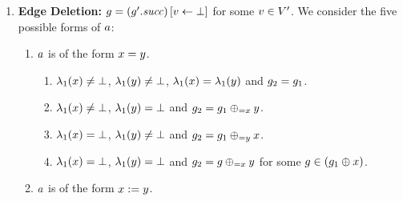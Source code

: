 {\begin{enumerate}
\begin{enumerate}
\begin{enumerate}
    $\labeling_1(\yvar)\neq\undef$, %
    $\labeling_1(\xvar)\neq\labeling_1(\nil)$ %
    and %
    $\graph_2=\graph_1$.
  \item \label{pre:case:dotNextAssignedD}%
    $\labeling_1(\xvar)\neq\undef$, %
    $\suc(\labeling_1(\xvar))=\undef$, %
    $\labeling_1(\yvar)=\undef$, %
    $\labeling_1(\xvar)\neq\labeling_1(\nil)$ and %
    $\graph_2\in\graph_1\addVar{\yvar}$.
  \item \label{pre:case:dotNextAssignedE}%
    $\labeling_1(\xvar)=\undef$,%
    $\labeling_1(\yvar)\neq\undef$ and %
    $\graph_2=\graph\delEdge{\xvar}$, where %
    $\graph\in\graph_1\addVarAsPredOf{\yvar}{\xvar}$.
  \item \label{pre:case:dotNextAssignedF}%
    $\labeling_1(\xvar)=\undef$, %
    $\labeling_1(\yvar)=\undef$ and %
    there are graphs $\graph,\graph'$ such that
    $\graph\in\graph_1\addVar{\yvar}$, %
    $\graph'\in\graph\addVarAsPredOf{\yvar}{\xvar}$ and %
    $\graph_2=\graph'\delEdge{\xvar}$.
  \end{enumerate}
%
\end{enumerate}
\item {\bf Edge Deletion:}
$g=\left(g'.{\it succ}\right)\left[v\leftarrow\bot\right]$ 
for some
$v\in V'$.
%
We consider
the five possible forms of $a$:
%
%
\begin{enumerate}
\item $a$ is of the form $x=y$.
  \begin{enumerate}
  \item
    \label{pre:case:equalsA}%
    $\lambda_1(x)\neq\bot$, %
    $\lambda_1(y)\neq\bot$, %
    $\lambda_1(x)=\lambda_1(y)$ and $\graph_2=\graph_1$.
  \item
    \label{pre:case:equalsB}%
    $\labeling_1(\xvar)\neq\undef$, %
    $\labeling_1(\yvar)=\undef$ and
    $g_2=g_1\oplus_{={x}}{y}$.
  \item
    \label{pre:case:equalsC}%
    $\labeling_1(\xvar)=\undef$, %
    $\labeling_1(\yvar)\neq\undef$ and
    $g_2=g_1\oplus_{={y}}{x}$.
  \item
    \label{pre:case:equalsD}%
    $\labeling_1(\xvar)=\undef$, %
    $\labeling_1(\yvar)=\undef$ and
    $g_2=g\oplus_{={x}}{y}$ for some
    $g\in\left(g_1\oplus{\ensuremath{x}}\right)$.
  \end{enumerate}
\item $a$ is of the form $x:=y$.

\end{enumerate}
\end{enumerate}}

